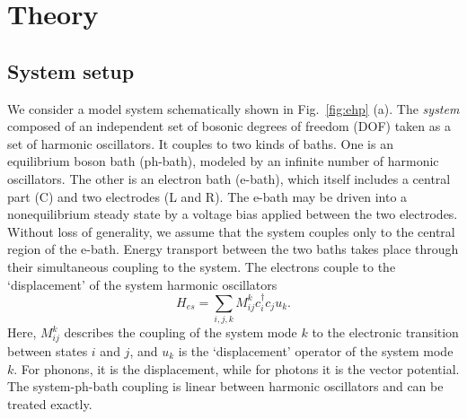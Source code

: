 \documentclass[aps,prb,
,floatfix,footinbib,shortbibliography,
preprint
]{revtex4-1}
\begin{document}

\section{Theory}
\subsection{System setup}
We consider a model system schematically shown in Fig.~\ref{fig:ehp} (a). The \emph{system} composed of an independent set of bosonic degrees of freedom (DOF) taken as a set of harmonic oscillators. It couples to two kinds of baths. One is an equilibrium boson bath (ph-bath), modeled by an infinite number of harmonic oscillators. The other is an electron bath (e-bath), which itself includes a central part (C) and two electrodes (L and R).  The e-bath may be driven into a nonequilibrium steady state by a voltage bias applied between the two electrodes. Without loss of generality, we assume that the system couples only to the central region of the e-bath. Energy transport between the two baths takes place through their simultaneous coupling to the system. 
The electrons couple to the `displacement' of the system harmonic oscillators
\begin{equation}
H_{es} = \sum_{i,j,k} M^{k}_{ij}c^\dagger_i c_j u_k.
\label{eq:eboson}
\end{equation}
Here, $M^k_{ij}$ describes the coupling of the system mode $k$ to the electronic transition between states $i$ and $j$, and $u_k$ is the `displacement' operator of the system mode $k$. For phonons, it is the displacement, while for photons it is the vector potential. The system-ph-bath coupling is linear between harmonic oscillators and can be treated exactly.
\end{document}
